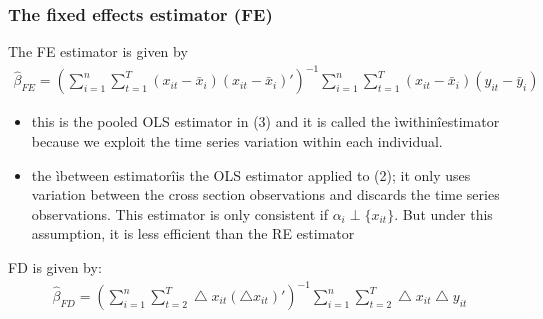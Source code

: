 \documentclass[a4paper,twoside,11pt]{article}
\begin{document}
\subsubsection{The fixed effects estimator (FE)}
\begin{shaded*}
The FE estimator is given by
\begin{equation*}
\begin{aligned}
\hat{\beta}_{FE} = (\sum^n_{i=1} \sum^T_{t=1} (x_{it} - \bar x_i ) (x_{it} - \bar x_i )')^{-1} \sum^n_{i=1} \sum^T_{t=1} (x_{it} - \bar x_i ) (y_{it} - \bar y_i)
\end{aligned}
\end{equation*}
\begin{itemize}
    \item this is the pooled OLS estimator in (3) and it is called the ìwithinîestimator because we exploit the time series variation within each individual.
    \item the ìbetween estimatorîis the OLS estimator applied to (2); it only uses
    variation between the cross section observations and discards the time series observations. This estimator is only consistent if $\alpha_i \perp \{ x_{it} \}$. But under this assumption, it is less efficient than the RE estimator
\end{itemize}
FD is given by:
\begin{equation*}
\begin{aligned}
\hat{\beta}_{FD} = (\sum^n_{i=1} \sum^T_{t=2} \bigtriangleup x_{it} (\bigtriangleup x_{it})')^{-1} \sum^n_{i=1} \sum^T_{t=2} \bigtriangleup x_{it} \bigtriangleup y_{it}
\end{aligned}
\end{equation*}
\end{shaded*}
\end{document}
